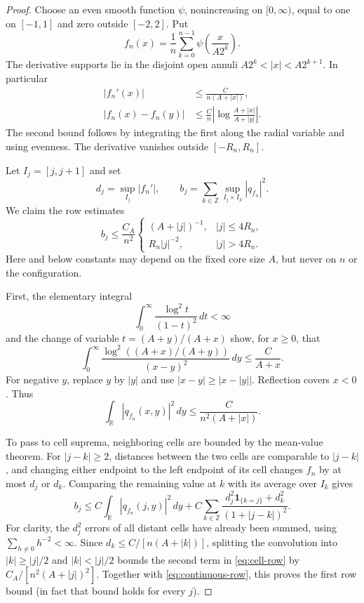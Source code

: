 \documentclass[11pt,reqno]{amsart}
\numberwithin{equation}{section}
\theoremstyle{definition}
\theoremstyle{remark}
\newcommand{\R}{\mathbb R}
\newcommand{\Z}{\mathbb Z}
\newcommand{\1}{\mathbf1}
\newcommand{\dd}{\,d}
\begin{document}
\begin{proof}
Choose an even smooth function $\psi$, nonincreasing on $[0,\infty)$,
equal to one on $[-1,1]$ and zero outside $[-2,2]$. Put
\begin{equation}\label{eq:cutoff}
f_n(x)=\frac1n\sum_{k=0}^{n-1}\psi\!\left(\frac{x}{A2^k}\right).
\end{equation}
The derivative supports lie in the disjoint open annuli
$A2^k<|x|<A2^{k+1}$. In particular
\begin{align}
|f_n'(x)|&\le\frac{C}{n(A+|x|)},\label{eq:derivative}\\
|f_n(x)-f_n(y)|&\le\frac Cn
\left|\log\frac{A+|x|}{A+|y|}\right|.\label{eq:logdiff}
\end{align}
The second bound follows by integrating the first along the radial
variable and using evenness. The derivative vanishes outside
$[-R_n,R_n]$.

Let $I_j=[j,j+1]$ and set
\[
d_j=\sup_{I_j}|f_n'|,\qquad
b_j=\sum_{k\in\Z}\sup_{I_j\times I_k}|q_{f_n}|^2.
\]
We claim the row estimates
\begin{equation}\label{eq:row}
b_j\le\frac{C_A}{n^2}
\begin{cases}
(A+|j|)^{-1},& |j|\le4R_n,\\
R_n|j|^{-2},& |j|>4R_n.
\end{cases}
\end{equation}
Here and below constants may depend on the fixed core size $A$, but
never on $n$ or the configuration.

First, the elementary integral
\[
\int_0^\infty\frac{\log^2 t}{(1-t)^2}\dd t<\infty
\]
and the change of variable $t=(A+y)/(A+x)$ show, for $x\ge0$, that
\[
\int_0^\infty
\frac{\log^2((A+x)/(A+y))}{(x-y)^2}\dd y
\le\frac{C}{A+x}.
\]
For negative $y$, replace $y$ by $|y|$ and use
$|x-y|\ge|x-|y||$. Reflection covers $x<0$. Thus
\begin{equation}\label{eq:continuous-row}
\int_\R |q_{f_n}(x,y)|^2\dd y
\le\frac{C}{n^2(A+|x|)}.
\end{equation}

To pass to cell suprema, neighboring cells are bounded by the
mean-value theorem. For $|j-k|\ge2$, distances between the two cells
are comparable to $|j-k|$, and changing either endpoint to the left
endpoint of its cell changes $f_n$ by at most $d_j$ or $d_k$.
Comparing the remaining value at $k$ with its average over $I_k$ gives
\begin{equation}\label{eq:cell-row}
b_j\le C\int_\R |q_{f_n}(j,y)|^2\dd y
 +C\sum_{k\in\Z}\frac{d_j^2\1_{\{k=j\}}+d_k^2}
                         {(1+|j-k|)^2}.
\end{equation}
For clarity, the $d_j^2$ errors of all distant cells have already
been summed, using $\sum_{h\ne0}h^{-2}<\infty$.
Since $d_k\le C/[n(A+|k|)]$, splitting the convolution into
$|k|\ge|j|/2$ and $|k|<|j|/2$ bounds the second term in
\eqref{eq:cell-row} by $C_A/[n^2(A+|j|)^2]$.
Together with \eqref{eq:continuous-row}, this proves the first row bound
(in fact that bound holds for every $j$).


\end{proof}
\end{document}
